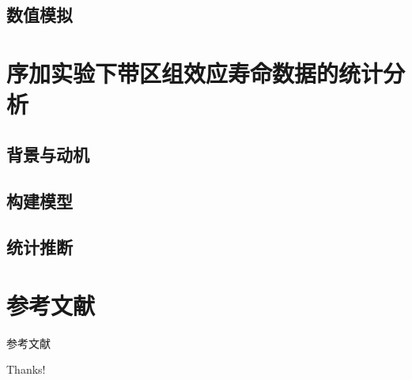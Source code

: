 \documentclass{beamer}
\begin{document}
\subsection{数值模拟}





\section{序加实验下带区组效应寿命数据的统计分析}

\subsection{背景与动机}


\subsection{构建模型}



\subsection{统计推断}




\section*{参考文献}

\begin{frame}[allowframebreaks]{参考文献}
    
     \tiny
\end{frame}

\begin{frame}
    \begin{center}
        {\Huge\calligra Thanks!}
    \end{center}
\end{frame}
\end{document}
